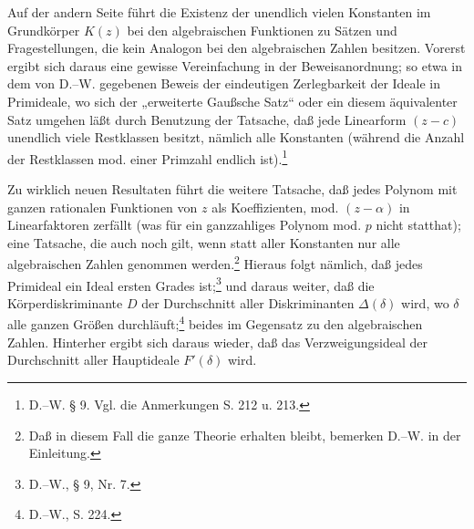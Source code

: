 \documentclass[11pt]{article}
\begin{document}
Auf der andern Seite führt die Existenz der unendlich vielen Konstanten im Grundkörper \(K(z)\) bei den algebraischen Funktionen zu Sätzen und Fragestellungen, die kein Analogon bei den algebraischen Zahlen besitzen. Vorerst ergibt sich daraus eine gewisse Vereinfachung in der Beweisanordnung; so etwa in dem von D.--W. gegebenen Beweis der eindeutigen Zerlegbarkeit der Ideale in Primideale, wo sich der „erweiterte Gaußsche Satz“ oder ein diesem äquivalenter Satz umgehen läßt durch Benutzung der Tatsache, daß jede Linearform \((z-c)\) unendlich viele Restklassen besitzt, nämlich alle Konstanten (während die Anzahl der Restklassen mod. einer Primzahl endlich ist).\footnote{D.--W. § 9. Vgl. die Anmerkungen S. 212 u. 213.}

Zu wirklich neuen Resultaten führt die weitere Tatsache, daß jedes Polynom mit ganzen rationalen Funktionen von \(z\) als Koeffizienten, mod. \((z-\alpha)\) in Linearfaktoren zerfällt (was für ein ganzzahliges Polynom mod. \(p\) nicht statthat); eine Tatsache, die auch noch gilt, wenn statt aller Konstanten nur alle algebraischen Zahlen genommen werden.\footnote{Daß in diesem Fall die ganze Theorie erhalten bleibt, bemerken D.--W. in der Einleitung.} Hieraus folgt nämlich, daß jedes Primideal ein Ideal ersten Grades ist;\footnote{D.--W., § 9, Nr. 7.} und daraus weiter, daß die Körperdiskriminante \(D\) der Durchschnitt aller Diskriminanten \(\Delta(\delta)\) wird, wo \(\delta\) alle ganzen Größen durchläuft;\footnote{D.--W., S. 224.} beides im Gegensatz zu den algebraischen Zahlen. Hinterher ergibt sich daraus wieder, daß das Verzweigungsideal der Durchschnitt aller Hauptideale \(F'(\delta)\) wird.
\end{document}
